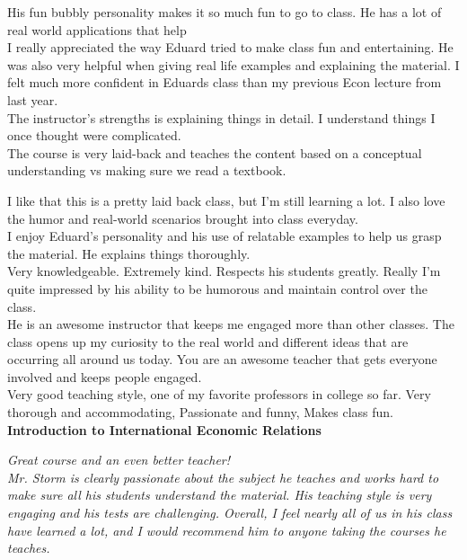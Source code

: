 \documentclass[a4paper,11pt]{article}
\begin{document}
His fun bubbly personality makes it so much fun to go to class. He has a lot of real world applications that help \\

I really appreciated the way Eduard tried to make class fun and entertaining. He was also very helpful when giving real life examples and explaining the material. I felt much more confident in Eduards class than my previous Econ lecture from last year. \\

The instructor's strengths is explaining things in detail. I understand things I once thought were complicated.  \\

The course is very laid-back and teaches the content based on a conceptual understanding vs making sure we read a textbook. 

I like that this is a pretty laid back class, but I'm still learning a lot. I also love the humor and real-world scenarios brought into class everyday.  \\

I enjoy Eduard's personality and his use of relatable examples to help us grasp the material. He explains things thoroughly.  \\

Very knowledgeable. Extremely kind. Respects his students greatly. Really I'm quite impressed by his ability to be humorous and maintain control over the class.  \\

He is an awesome instructor that keeps me engaged more than other classes. The class opens up my curiosity to the real world and different ideas that are occurring all around us today. You are an awesome teacher that gets everyone involved and keeps people engaged.  \\

Very good teaching style, one of my favorite professors in college so far. Very thorough and accommodating, Passionate and funny, Makes class fun.  \\

\textbf{Introduction to International Economic Relations}

\textit{Great course and an even better teacher!} \\

\textit{Mr. Storm is clearly passionate about the subject he teaches and works hard to make sure all his students understand the material. His teaching style is very engaging and his tests are challenging. Overall, I feel nearly all of us in his class have learned a lot, and I would recommend him to anyone taking the courses he teaches.} \\
\end{document}
